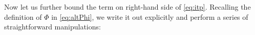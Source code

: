 \documentclass[11pt,onecolumn]{IEEEtran}
\begin{document}
Now let us further bound the term on right-hand side of \eqref{eq:itp}.
Recalling the definition of $\Phi$ in \eqref{eq:altPhi}, we write it out explicitly and
perform a series of straightforward manipulations:
\end{document}
